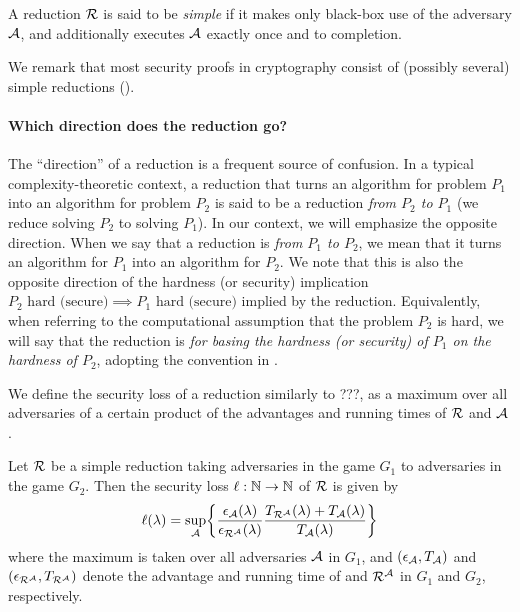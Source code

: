 \begin{definition}
  A reduction \(\redR\) is said to be \emph{simple}
  if it makes only black-box use of the adversary \(\mathcal{A}\),
  and additionally executes \(\mathcal{A}\) exactly once
  and to completion.
\end{definition}

We remark that most security proofs in cryptography
consist of (possibly several) simple reductions ().

\paragraph{Which direction does the reduction go?}
The ``direction'' of a reduction is a frequent source of confusion.
In a typical complexity-theoretic context,
a reduction that turns an algorithm for problem \(P_{1}\)
into an algorithm for problem \(P_{2}\)
is said to be a reduction \emph{from \(P_{2}\) to \(P_{1}\)}
(we reduce solving \(P_{2}\) to solving \(P_{1}\)).
In our context, we will emphasize the opposite direction.
When we say that a reduction is \emph{from \(P_{1}\) to \(P_{2}\)},
we mean that it turns an algorithm for \(P_{1}\) into an algorithm for \(P_{2}\).
We note that this is also the opposite direction of the hardness (or security) implication
\(P_{2} \text{ hard (secure)} \implies P_{1} \text{ hard (secure)}\)
implied by the reduction.
Equivalently,
when referring to the computational assumption that
the problem \(P_{2}\) is hard, we will say that the reduction
is \emph{for basing the hardness (or security) of \(P_{1}\) on the hardness of \(P_{2}\)},
adopting the convention in .

We define the security loss of a reduction \redR similarly to ???,
as a maximum over all adversaries \advA of a certain product of the
advantages and running times of \(\redR\) and \(\mathcal{A}\).

\begin{definition}\label{def:loss}
  Let \(\redR\) be a simple reduction
  taking adversaries in the game \(G_{1}\) to adversaries in the game \(G_{2}\).
  Then the security loss \(\ell : \mathbb{N} \to \mathbb{N}\) of \(\redR\) is given by
  \begin{equation}\label{eq:loss}
    \ell(\lambda) = \sup_{\advA} \left\{ \frac{\epsilon_{\advA}(\lambda)}{\epsilon_{\redR^{\advA}}(\lambda)}\frac{T_{\redR^{\advA}}(\lambda) + T_{\advA}(\lambda)}{T_{\advA}(\lambda)} \right\}
  \end{equation}
  where the maximum is taken over all adversaries \(\mathcal{A}\) in \(G_{1}\),
  and \((\epsilon_{\mathcal{A}}, T_{\mathcal{A}})\) and \((\epsilon_{\redR^{\advA}}, T_{\redR^{\advA}})\)
  denote the advantage and running time of \advA and \(\redR^{\advA}\) in \(G_{1}\) and \(G_{2}\), respectively.
\end{definition}

